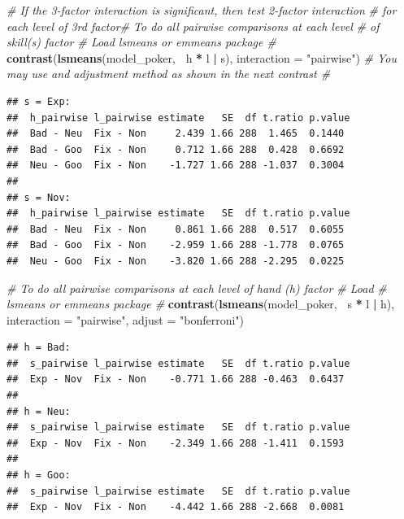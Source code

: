 \documentclass[]{article}
\newenvironment{Shaded}{\begin{snugshade}}{\end{snugshade}}
\newcommand{\CommentTok}[1]{\textcolor[rgb]{0.56,0.35,0.01}{\textit{#1}}}
\newcommand{\DataTypeTok}[1]{\textcolor[rgb]{0.13,0.29,0.53}{#1}}
\newcommand{\KeywordTok}[1]{\textcolor[rgb]{0.13,0.29,0.53}{\textbf{#1}}}
\newcommand{\NormalTok}[1]{#1}
\newcommand{\OperatorTok}[1]{\textcolor[rgb]{0.81,0.36,0.00}{\textbf{#1}}}
\newcommand{\StringTok}[1]{\textcolor[rgb]{0.31,0.60,0.02}{#1}}
\begin{document}
\begin{Shaded}
\begin{Highlighting}[]
\CommentTok{# If the 3-factor interaction is significant, then test 2-factor interaction}
\CommentTok{# for each level of 3rd factor# To do all pairwise comparisons at each level}
\CommentTok{# of skill(s) factor # Load lsmeans or emmeans package #}
\KeywordTok{contrast}\NormalTok{(}\KeywordTok{lsmeans}\NormalTok{(model_poker, }\OperatorTok{~}\NormalTok{h }\OperatorTok{*}\StringTok{ }\NormalTok{l }\OperatorTok{|}\StringTok{ }\NormalTok{s), }\DataTypeTok{interaction =} \StringTok{"pairwise"}\NormalTok{)  }\CommentTok{# You may use and adjustment method as shown in the next contrast #}
\end{Highlighting}
\end{Shaded}

\begin{verbatim}
## s = Exp:
##  h_pairwise l_pairwise estimate   SE  df t.ratio p.value
##  Bad - Neu  Fix - Non     2.439 1.66 288  1.465  0.1440 
##  Bad - Goo  Fix - Non     0.712 1.66 288  0.428  0.6692 
##  Neu - Goo  Fix - Non    -1.727 1.66 288 -1.037  0.3004 
## 
## s = Nov:
##  h_pairwise l_pairwise estimate   SE  df t.ratio p.value
##  Bad - Neu  Fix - Non     0.861 1.66 288  0.517  0.6055 
##  Bad - Goo  Fix - Non    -2.959 1.66 288 -1.778  0.0765 
##  Neu - Goo  Fix - Non    -3.820 1.66 288 -2.295  0.0225
\end{verbatim}

\begin{Shaded}
\begin{Highlighting}[]
\CommentTok{# To do all pairwise comparisons at each level of hand (h) factor # Load}
\CommentTok{# lsmeans or emmeans package #}
\KeywordTok{contrast}\NormalTok{(}\KeywordTok{lsmeans}\NormalTok{(model_poker, }\OperatorTok{~}\NormalTok{s }\OperatorTok{*}\StringTok{ }\NormalTok{l }\OperatorTok{|}\StringTok{ }\NormalTok{h), }\DataTypeTok{interaction =} \StringTok{"pairwise"}\NormalTok{, }\DataTypeTok{adjust =} \StringTok{"bonferroni"}\NormalTok{)}
\end{Highlighting}
\end{Shaded}

\begin{verbatim}
## h = Bad:
##  s_pairwise l_pairwise estimate   SE  df t.ratio p.value
##  Exp - Nov  Fix - Non    -0.771 1.66 288 -0.463  0.6437 
## 
## h = Neu:
##  s_pairwise l_pairwise estimate   SE  df t.ratio p.value
##  Exp - Nov  Fix - Non    -2.349 1.66 288 -1.411  0.1593 
## 
## h = Goo:
##  s_pairwise l_pairwise estimate   SE  df t.ratio p.value
##  Exp - Nov  Fix - Non    -4.442 1.66 288 -2.668  0.0081
\end{verbatim}
\end{document}
